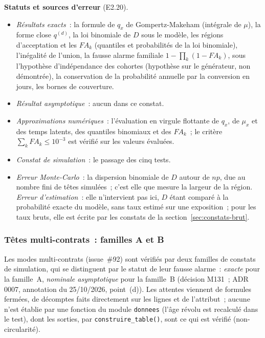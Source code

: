 \documentclass[a4paper,11pt]{article}
\newcommand{\code}[1]{\texttt{\small #1}}
\begin{document}
\begin{encadre}
\small
\textbf{Statuts et sources d'erreur} (E2.20).
\begin{itemize}[leftmargin=*, itemsep=1pt, topsep=2pt]
  \item \emph{Résultats exacts}~: la formule de $q_x$ de Gompertz-Makeham
    (intégrale de $\mu$), la forme close $q^{(d)}$, la loi binomiale de $D$
    sous le modèle, les régions d'acceptation et les $FA_k$ (quantiles et
    probabilités de la loi binomiale), l'inégalité de l'union, la
    fausse alarme familiale $1 - \prod_k (1 - FA_k)$, sous l'hypothèse
    d'indépendance des cohortes (hypothèse sur le générateur, non
    démontrée), la conservation de la probabilité annuelle par la conversion
    en jours, les bornes de couverture.
  \item \emph{Résultat asymptotique}~: aucun dans ce constat.
  \item \emph{Approximations numériques}~: l'évaluation en virgule flottante
    de $q_x$, de $\mu_x$ et des temps latents, des quantiles binomiaux et des
    $FA_k$~; le critère $\sum_k FA_k \le 10^{-3}$ est vérifié sur les valeurs
    évaluées.
  \item \emph{Constat de simulation}~: le passage des cinq tests.
  \item \emph{Erreur Monte-Carlo}~: la dispersion binomiale de $D$ autour de
    $np$, due au nombre fini de têtes simulées~; c'est elle que mesure la
    largeur de la région. \emph{Erreur d'estimation}~: elle n'intervient pas
    ici, $D$ étant comparé à la probabilité exacte du modèle, sans taux estimé
    sur une exposition~; pour les taux bruts, elle est écrite par les
    constats de la section~\ref{sec:constats-brut}.
\end{itemize}
\end{encadre}

\subsubsection*{Têtes multi-contrats~: familles A et B}

Les modes multi-contrats (issue~\#92) sont vérifiés par deux familles de
constats de simulation, qui se distinguent par le statut de leur fausse
alarme~: \emph{exacte} pour la famille~A, \emph{nominale asymptotique} pour
la famille~B (décision M131~; ADR 0007, annotation du 25/10/2026,
point~(d)). Les attentes viennent de formules fermées, de décomptes faits
directement sur les lignes et de l'attribut~; aucune n'est établie par une
fonction du module \code{donnees} (l'âge révolu est recalculé dans le test),
dont les sorties, par \code{construire\_table()}, sont ce qui est vérifié
(non-circularité).
\end{document}
